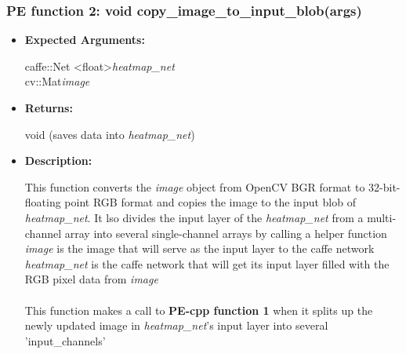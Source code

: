 \documentclass{scrreprt}
\begin{document}
\subsubsection{PE function 2: void copy\_image\_to\_input\_blob(args)}
\begin{itemize}
    \item \textbf{Expected Arguments:}

    caffe::Net \textless float\textgreater\quad\textit{heatmap\_net}
    \\
    cv::Mat\quad\textit{image}

    \item \textbf{Returns:}

    void (saves data into \textit{heatmap\_net})

    \item \textbf{Description:}

    This function converts the \textit{image} object from OpenCV BGR format to 32-bit-floating point RGB format and copies the image to the input blob of \textit{heatmap\_net}. It lso divides the input layer of the \textit{heatmap\_net} from a multi-channel array into several single-channel arrays by calling a helper function
    \\
    \textit{image} is the image that will serve as the input layer to the caffe network
    \\
    \textit{heatmap\_net} is the caffe network that will get its input layer filled with the RGB pixel data from \textit{image}
    \\\\
    This function makes a call to \textbf{PE-cpp function 1} when it splits up the newly updated image in \textit{heatmap\_net}'s input layer into several 'input\_channels'
\end{itemize}
\end{document}
